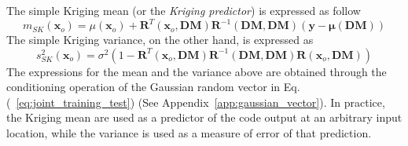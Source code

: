 The simple Kriging mean (or the \emph{Kriging predictor}) is expressed as follow
\begin{equation}
	m_{SK} (\bm{x}_o) = \mu (\bm{x}_o) + \mathbf{R}^T(\bm{x}_o, \mathbf{DM}) \mathbf{R}^{-1}(\mathbf{DM}, \mathbf{DM}) (\mathbf{y} - \boldsymbol{\mu}(\mathbf{DM}))
\label{eq:mean_sk}
\end{equation}
The simple Kriging variance, on the other hand, is expressed as
\begin{equation}
	s^2_{SK} (\bm{x}_o) = \sigma^2 (1 - \mathbf{R}^T(\bm{x}_o, \mathbf{DM}) \mathbf{R}^{-1}(\mathbf{DM}, \mathbf{DM}) \mathbf{R}(\bm{x}_o, \mathbf{DM}))
\label{eq:variance_sk}
\end{equation}
The expressions for the mean and the variance above are obtained through the conditioning operation of the Gaussian random vector in Eq.(~\ref{eq:joint_training_test}) (See Appendix~\ref{app:gaussian_vector}). 
In practice, the Kriging mean are used as a predictor of the code output at an arbitrary input location, 
while the variance is used as a measure of error of that prediction.

